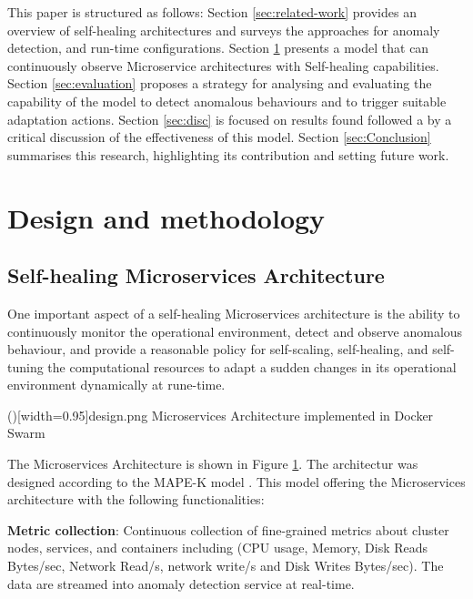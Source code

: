 \documentclass{ieeeaccess}
\begin{document}
This paper is structured as follows: Section \ref{sec:related-work} provides an overview of self-healing architectures and surveys the approaches for  anomaly detection, and run-time configurations. Section \ref{sec:modelling} presents a model that can continuously observe Microservice architectures with Self-healing capabilities. Section \ref{sec:evaluation} proposes a strategy for analysing and evaluating the capability of the model  to detect anomalous behaviours and to trigger suitable adaptation actions. Section \ref{sec:disc} is focused on results found followed a by a critical discussion of the effectiveness of this model. Section \ref{sec:Conclusion} summarises this research, highlighting its contribution and setting future work.


\section{Design and methodology}
\label{sec:modelling}
\subsection{Self-healing Microservices Architecture}
One important aspect of a self-healing Microservices architecture is the ability to continuously monitor the operational environment, detect and observe anomalous behaviour, and provide a reasonable policy for self-scaling, self-healing, and self-tuning the computational resources to adapt a sudden changes in its operational environment dynamically at rune-time.  
 
\Figure[!t]()[width=0.95\textwidth]{design.png}
   {Microservices Architecture implemented in Docker Swarm \label{fig_model}}
 
The Microservices Architecture is shown in Figure \ref{sec:modelling}. The architectur was designed according to the MAPE-K model  \cite{computing2006architectural}. This model offering the Microservices architecture with the following functionalities: 

\textbf{Metric collection}: Continuous collection of fine-grained metrics about cluster nodes, services, and containers including (CPU usage, Memory, Disk Reads Bytes/sec, Network Read/s, network write/s and Disk Writes Bytes/sec). The data are streamed into anomaly detection service at real-time. 
\end{document}
